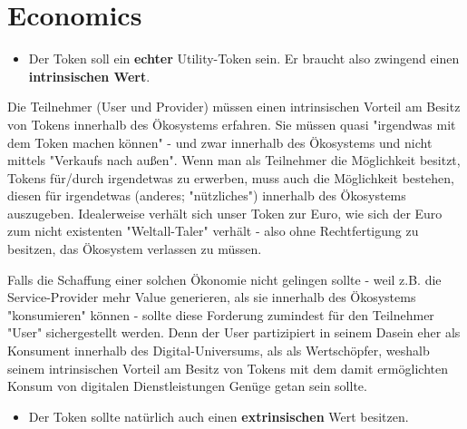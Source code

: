 \section{Economics} 
\label{sec:economics}


\vspace{0.3cm}

\begin{Praemisse}

\begin{itemize}
  \item Der Token soll ein \textbf{echter} Utility-Token sein. Er braucht also zwingend einen \textbf{intrinsischen Wert}.
\end{itemize}

\vspace{0.2cm}

Die Teilnehmer (User und Provider) müssen einen intrinsischen Vorteil am Besitz von Tokens innerhalb des Ökosystems erfahren. Sie müssen quasi "irgendwas mit dem Token machen können" - und zwar innerhalb des Ökosystems und nicht mittels "Verkaufs nach außen". Wenn man als Teilnehmer die Möglichkeit besitzt, Tokens für/durch irgendetwas zu erwerben, muss auch die Möglichkeit bestehen, diesen für irgendetwas (anderes; "nützliches") innerhalb des Ökosystems auszugeben. Idealerweise verhält sich unser Token zur Euro, wie sich der Euro zum nicht existenten "Weltall-Taler" verhält - also ohne Rechtfertigung zu besitzen, das Ökosystem verlassen zu müssen.

Falls die Schaffung einer solchen Ökonomie nicht gelingen sollte - weil z.B. die Service-Provider mehr Value generieren, als sie innerhalb des Ökosystems "konsumieren" können -  sollte diese Forderung zumindest für den Teilnehmer "User" sichergestellt werden. Denn der User partizipiert in seinem Dasein eher als Konsument innerhalb des Digital-Universums, als als Wertschöpfer, weshalb seinem intrinsischen Vorteil am Besitz von Tokens mit dem damit ermöglichten Konsum von digitalen Dienstleistungen Genüge getan sein sollte.

\vspace{0.3cm}

\begin{itemize}
  \item Der Token sollte natürlich auch einen \textbf{extrinsischen} Wert besitzen.
\end{itemize}


\end{Praemisse}
